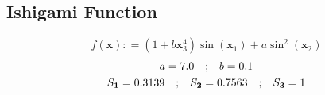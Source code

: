 \documentclass[preprint,12pt]{elsarticle}
\newcommand*{\M}[1]{\ensuremath{#1}\xspace}
\newcommand*{\vr}[1]{\M{\mathbf{#1}}}
\newcommand*{\deq}{\M{\mathrel{\mathop:}=}}
\newcommand{\T}[1]{\text{#1}}
\newcommand*{\QT}[2][]{\M{\quad\T{#2}\ifthenelse{\equal{#1}{}}{\quad}{#1}}}
\begin{document}



        \subsection{Ishigami Function} \label{sub:Results:Ishigami}
            \begin{equation} \label{def:Ishigami}
                f(\vr{x}) \deq \left(1 + b \vr{x}_3^4\right) \sin(\vr{x}_1) + a \sin^{2}(\vr{x}_2)
            \end{equation}
            \begin{gather*}
                a = 7.0 \QT{;} b = 0.1 \\
                S_{\vr{1}} = 0.3139 \QT{;}S_{\vr{2}} = 0.7563 \QT{;} S_{\vr{3}} = 1
            \end{gather*}
            
\end{document}

